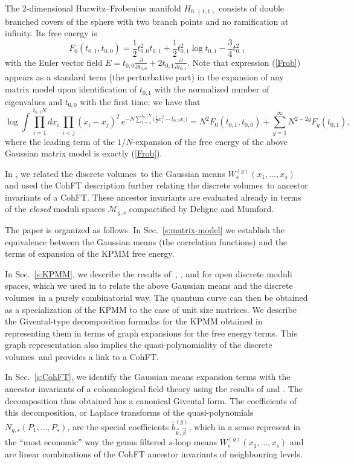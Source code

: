 \documentclass[11pt]{article}
\def\beq{\begin{equation}}
\def\eeq{\end{equation}}
\theoremstyle{plain}
\theoremstyle{definition}
\def\beq{\begin{equation}}
\def\eeq{\end{equation}}
\newcommand {\dvol}{discrete volumes}%
\begin{document}
The 2-dimensional Hurwitz--Frobenius manifold $H_{0,(1,1)}$ consists of double branched covers of the sphere with two branch points and no ramification at infinity.  Its free energy is
\beq
F_0(t_{0,1},t_{0,0})=\frac{1}{2}t_{0,0}^2t_{0,1}+\frac{1}{2}t_{0,1}^2\log{t_{0,1}}-\frac34 t^2_{0,1}
\label{Frob}
\eeq
with the Euler vector field $E=t_{0,0}\frac{\partial}{\partial t_{0,0}}+2t_{0,1}\frac{\partial}{\partial t_{0,1}}.$
Note that expression (\ref{Frob}) appears as a standard term (the perturbative part) in the
expansion of any matrix model upon identification of $t_{0,1}$ with the normalized number of eigenvalues and $t_{0,0}$
with the first time; we have that
$$
\log\int \prod_{i=1}^{t_{0,1}N}dx_i\,\prod_{i<j}(x_i-x_j)^2 \,e^{-N\sum_{i=1}^{t_{0,1}N} \bigl(\frac12 x_i^2-t_{0,0}x_i\bigr)}
=N^2 F_0(t_{0,1},t_{0,0})+\sum_{g=1}^\infty N^{2-2g} F_g(t_{0,1}),
$$
where the leading term of the $1/N$-expansion of the free energy of the above Gaussian matrix model is exactly (\ref{Frob}).

In \cite{ACNP}, we related the \dvol\  to the Gaussian means $W^{(g)}_{s}(x_1,\dots,x_s)$
and used the CohFT description further relating
the \dvol\  to ancestor invariants of a CohFT. These ancestor invariants are evaluated already
in terms of the {\em closed} moduli spaces ${\mathcal M}_{g,s}$ compactified by Deligne and Mumford.

The paper is organized as follows. In Sec.~\ref{s:matrix-model} we establish the equivalence between the Gaussian
means (the correlation functions) and the terms of expansion of the KPMM free energy. 

In Sec.~\ref{s:KPMM}, we describe the results of~\cite{Ch93}, \cite{Ch95}, and \cite{Norbury} for open discrete
moduli spaces, which we used in \cite{ACNP} to relate the above Gaussian means and the \dvol\  in a purely combinatorial way. 
The quantum curve can then be obtained as a specialization of the KPMM to the case of unit size matrices. We describe the Givental-type
decomposition formulas for the KPMM obtained in \cite{Ch95} representing them in terms of graph expansions for
the free energy terms. This graph representation also implies the quasi-polynomiality of
the \dvol\  and provides a link to a CohFT.  

In Sec.~\ref{s:CohFT}, we identify the Gaussian means expansion terms with the ancestor invariants of
a cohomological field theory using the results of \cite{DNOPSSup} and \cite{DOSSIde}. The decomposition thus obtained has a canonical Givental form. The coefficients of 
this decomposition, or Laplace transforms of the quasi-polynomials $N_{g,s}(P_1,\dots,P_s)$,
are the special coefficients $\widehat b_{\vec k,\vec \beta}^{(g)}$, 
which in a sense represent in the ``most economic'' way the
genus filtered $s$-loop means $W_s^{(g)}(x_1,\dots, x_s)$ and 
are linear combinations of the CohFT ancestor invariants of neighbouring levels. 
\end{document}
